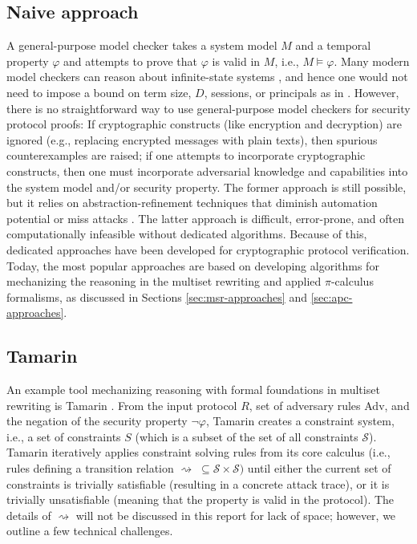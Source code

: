 \documentclass{article}
\theoremstyle{definition}
\begin{document}
\subsection{Naive approach} A general-purpose model checker takes a system model $M$ and a temporal property $\varphi$ and attempts to prove that $\varphi$ is valid in $M$, i.e., $M \models \varphi$. Many modern model checkers can reason about infinite-state systems \cite{nuxmv,kind2}, and hence one would not need to impose a bound on term size, $D$, sessions, or principals as in \cite{satmc}. However, there is no straightforward way to use general-purpose model checkers for security protocol proofs: If cryptographic constructs (like encryption and decryption) are ignored (e.g., replacing encrypted messages with plain texts), then spurious counterexamples are raised; if one attempts to incorporate cryptographic constructs, then one must incorporate adversarial knowledge and capabilities into the system model and/or security property. The former approach is still possible, but it relies on abstraction-refinement techniques that diminish automation potential or miss attacks \cite{lteinspector,5greasoner,uptane_analysis}. The latter approach is difficult, error-prone, and often computationally infeasible without dedicated algorithms. Because of this, dedicated approaches have been developed for cryptographic protocol verification. Today, the most popular approaches are based on developing algorithms for mechanizing the reasoning in the multiset rewriting and applied $\pi$-calculus formalisms, as discussed in Sections \ref{sec:msr-approaches} and \ref{sec:apc-approaches}.

\subsection {Tamarin}\label{sec:tamarin} 
An example tool mechanizing reasoning with formal foundations in multiset rewriting is Tamarin \cite{tamarin}. 
From the input protocol $R$, set of adversary rules \textsf{Adv}, 
and the negation of the security property $\neg\varphi$, 
Tamarin creates a constraint system, i.e., a set of constraints $S$ 
(which is a subset of the set of all constraints $\mathcal{S}$). 
Tamarin iteratively applies constraint solving rules from its core calculus 
(i.e., rules defining a transition relation 
$\rightsquigarrow \; \subseteq \mathcal{S} \times \mathcal{S})$ 
until either the current set of constraints is trivially satisfiable (resulting in a concrete attack trace), 
or it is trivially unsatisfiable (meaning that the property is valid in the protocol). 
The details of $\rightsquigarrow$ will not be discussed in this report for lack of space; however, we outline a few technical challenges.
\end{document}
